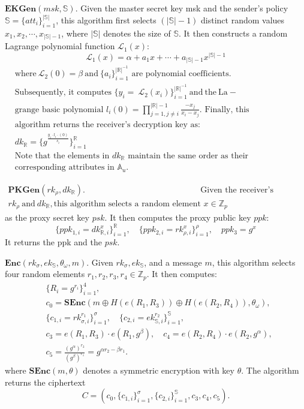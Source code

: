 \documentclass[runningheads]{llncs}
\begin{document}
$\textbf{EKGen}( msk, \mathbb{S} ) .$ Given the master secret key msk and the sender's policy $\mathbb{S}=\{att_i\}_{i=1}^{|\mathbb{S}|}$, this algorithm first selects $(|\mathbb{S}|-1)$ distinct random values $x_1,x_2,\cdots,x_{|\mathbb{S}|-1}$, where $|\mathbb{S}|$ denotes the size of $\mathbb{S}.$ It then constructs a random Lagrange polynomial function $\mathcal{L}_1(x):$
$$\mathcal{L}_1(x)=\alpha+a_1x+\cdots+a_{|\mathbb{S}|-1}x^{|\mathbb{S}|-1}$$
$\begin{aligned}&\mathrm{where~}\mathcal{L}_2(0)=\beta\mathrm{~and~}\{a_i\}_{i=1}^{|\mathbb{R}|^{-1}}\text{ are polynomial coefficients.}\\&\text{Subsequently, it computes }\{y_i=\mathrm{~}\mathcal{L}_2(x_i)\}_{i=1}^{|\mathbb{R}|^{-1}}\mathrm{~and~the~La-}\\&\text{grange basic polynomial }l_i(0)=\prod_{j=1,j\neq i}^{|\mathbb{R}|-1}\frac{-x_j}{x_i-x_j}.\text{ Finally, this}\\&\text{algorithm returns the receiver's decryption key as:}\\&dk_{\mathbb{R}}=\{g^{\frac{y_i\cdot l_i\cdot(0)}{s_i}}\}_{i=1}^{\mathbb{R}}\\&\text{Note that the elements in }dk_{\mathbb{R}}\text{ maintain the same order as their}\\&\text{corresponding attributes in }\mathbb{A}_u.\end{aligned}$

$\begin{aligned}\mathbf{PKGen}(rk_\rho,dk_\mathbb{R}).&\text{ Given the receiver's registration key}\\rk_\rho\mathrm{~and~}dk_\mathbb{R},\text{this algorithm selects a random element }x\in\mathbb{Z}_p\end{aligned}$
as the proxy secret key $psk.$ It then computes the proxy public key $ppk$:
$$\{ppk_{1,i}=dk_{\mathbb{R},i}^x\}_{i=1}^\mathbb{R},\quad\{ppk_{2,i}=rk_{\rho,i}^x\}_{i=1}^\rho,\quad ppk_3=g^x$$
It returns the ppk and the $psk.$

$\mathbf{Enc}(rk_\sigma,ek_{\mathbb{S}},\theta_\omega,m).$ Given $rk_\sigma,ek_\mathbb{S}$, and a message $m$, this algorithm selects four random elements $r_1,r_2,r_3,r_4\in\mathbb{Z}_p.$ It then computes:
$$\begin{aligned}&\{R_i=g^{r_i}\}_{i=1}^4,\\&c_0=\mathbf{SEnc}(m\oplus H(e(R_1,R_3))\oplus H(e(R_2,R_4)),\theta_\omega),\\&\{c_{1,i}=rk_{\sigma,i}^{r_1}\}_{i=1}^\sigma,\quad\{c_{2,i}=ek_{\mathbb{S},i}^{r_2}\}_{i=1}^\mathbb{S},\\&c_3=e(R_1,R_3)\cdot e(R_1,g^\beta),\quad c_4=e(R_2,R_4)\cdot e(R_2,g^\alpha),\\&c_5=\frac{(g^\alpha)^{r_2}}{(g^\beta)^{r_1}}=g^{\alpha r_2-\beta r_1}.\end{aligned}$$
where $\textbf{SEnc}( m, \theta )$ denotes a symmetric encryption with key $\theta .$ The algorithm returns the ciphertext
$$C = (c_0,\{c_{1,i}\}_{i=1}^\sigma,\{c_{2,i}\}_{i=1}^\mathbb{S},c_3,c_4,c_5).$$
\end{document}
